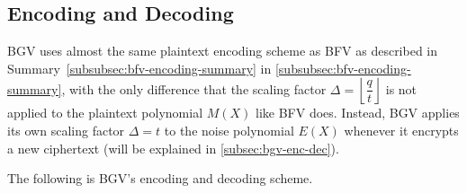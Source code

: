 \clearpage

\subsection{Encoding and Decoding}
\label{subsec:bgv-encoding-decoding}

BGV uses almost the same plaintext encoding scheme as BFV as described in Summary~\ref{subsubsec:bfv-encoding-summary} in \autoref{subsubsec:bfv-encoding-summary}, with the only difference that the scaling factor $\Delta = \left\lfloor\dfrac{q}{t}\right\rfloor$ is not applied to the plaintext polynomial $M(X)$ like BFV does. Instead, BGV applies its own scaling factor $\Delta = t$ to the noise polynomial $E(X)$ whenever it encrypts a new ciphertext (will be explained in \autoref{subsec:bgv-enc-dec}). 

The following is BGV's encoding and decoding scheme. 

